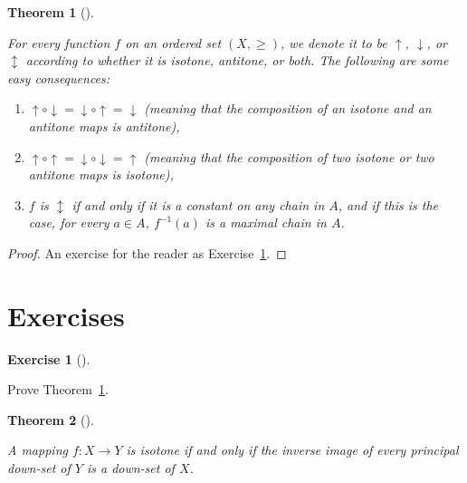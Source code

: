 \documentclass[
  letterpaper,
  10pt,
  reqno,
  twopage,
  openany]{book}
\providecommand{\tightlist}{%
  \setlength{\itemsep}{0pt}\setlength{\parskip}{0pt}}\usepackage{longtable,booktabs,array}
\theoremstyle{plain}
\theoremstyle{definition}
\newtheorem{exercise}{Exercise}[chapter]
\theoremstyle{definition}
\theoremstyle{definition}
\theoremstyle{plain}
\theoremstyle{plain}
\newtheorem{theorem}{Theorem}[chapter]
\theoremstyle{remark}
\begin{document}
\leavevmode{}%
\begin{theorem}[]\label{thm-isotone-antitone}

For every function \(f\) on an ordered set \((X,\geq)\), we denote it to
be \(\uparrow\), \(\downarrow\), or \(\updownarrow\) according to
whether it is isotone, antitone, or both. The following are some easy
consequences:

\begin{enumerate}
\def\labelenumi{\arabic{enumi}.}
\tightlist
\item
  \(\uparrow \circ \downarrow = \downarrow \circ \uparrow = \downarrow\)
  (meaning that the composition of an isotone and an antitone maps is
  antitone),
\item
  \(\uparrow \circ \uparrow = \downarrow \circ \downarrow = \uparrow\)
  (meaning that the composition of two isotone or two antitone maps is
  isotone),
\item
  \(f\) is \(\updownarrow\) if and only if it is a constant on any chain
  in \(A\), and if this is the case, for every \(a\in A\), \(f^{-1}(a)\)
  is a maximal chain in \(A\).
\end{enumerate}

\end{theorem}

\begin{proof}

An exercise for the reader as Exercise~\ref{exr-isotone-antitone}.

\end{proof}

\hypertarget{exercises-7}{%
\section{Exercises}\label{exercises-7}}

\leavevmode{}%
\begin{exercise}[]\label{exr-isotone-antitone}

Prove Theorem~\ref{thm-isotone-antitone}.

\end{exercise}

\leavevmode{}%
\begin{theorem}[]\label{thm-op-isotone}

A mapping \(f:X\to Y\) is isotone if and only if the inverse image of
every principal down-set of \(Y\) is a down-set of \(X\).

\end{theorem}
\end{document}
